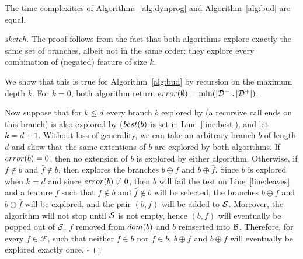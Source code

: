 \documentclass{llncs}
\def\posclass{+}
\def\negclass{-}
\def\datasymb{D}
\newcommand{\setex}[1]{\ensuremath{{\mathcal \datasymb}^{#1}}\xspace}
\newcommand{\posex}{{\setex{\posclass}}\xspace}
\newcommand{\negex}{{\setex{\negclass}}\xspace}
\newcommand{\features}{\ensuremath{{\mathcal F}}\xspace}
\newcommand{\bud}[0]{\ensuremath{{\cal B}}}
\newcommand{\sequence}[0]{\ensuremath{{\cal S}}}
\newcommand{\afeat}[0]{\ensuremath{f}}
\newcommand{\dom}[1][]{\ensuremath{\ifthenelse{\equal{#1}{}}{dom}{dom({#1})}}}
\newcommand{\best}[1][]{\ensuremath{\ifthenelse{\equal{#1}{}}{{best}}{{best({#1})}}}}
\newcommand{\error}[1][]{\ensuremath{\ifthenelse{\equal{#1}{}}{{error}}{{error({{#1}})}}}}
\newcommand{\abranch}[0]{\ensuremath{b}}
\newcommand{\mdepth}[0]{\ensuremath{k}}
\newcommand{\grow}[2]{\ensuremath{{#1}\oplus{#2}}}
\begin{document}



		

		\begin{theorem}
			The time complexities of Algorithms~\ref{alg:dynprog} and Algorithm~\ref{alg:bud} are equal.
			\end{theorem}
			
			\begin{proof}[sketch]
				The proof follows from the fact that both algorithms explore exactly the same set of branches, albeit not in the same order:
				they explore every combination of (negated) feature of size $\mdepth$.
				
				We show that this is true for Algorithm~\ref{alg:bud} by recursion on the maximum depth $\mdepth$.
				For $\mdepth = 0$, both algorithm return $\error[\emptyset]=\min(|\negex|, |\posex|)$.
				
				Now suppose that for $\mdepth \leq d$ every branch $\abranch$ explored by \dynprog (a recursive call ends on this branch) is also explored by \budalg ($\best[\abranch]$ is set in Line~\ref{line:best}), and let $\mdepth=d+1$. Without loss of generality, we can take an arbitrary branch $\abranch$ of length $d$ and show that the same extentions of $\abranch$ are explored by both algorithms.
				If $\error[\abranch]=0$, then no extension of $\abranch$ is explored by either algorithm.
				Otherwise, if $\afeat \not\in \abranch$ and $\bar{\afeat}\not\in \abranch$, then 
				\dynprog explores the branches $\grow{\abranch}{\afeat}$ and $\grow{\abranch}{\bar{\afeat}}$.
				Since $\abranch$ is explored when $\mdepth = d$ and since $\error[\abranch] \neq 0$, then $\abranch$ will fail the test on Line~\ref{line:leaves} and a feature $\afeat$ such that $\afeat \not\in \abranch$ and $\bar{\afeat}\not\in \abranch$ will be selected, 
				the branches $\grow{\abranch}{\afeat}$ and $\grow{\abranch}{\bar{\afeat}}$ will be explored, and the pair $(\abranch, \afeat)$ will be added to $\sequence$. 
				Moreover, the algorithm will not stop until $\sequence$ is not empty, hence $(\abranch, \afeat)$ will eventually be popped out of $\sequence$, $\afeat$ removed from $\dom[\abranch]$ and $\abranch$ reinserted into $\bud$. Therefore, for every $\afeat \in \features$, such that neither $\afeat \in \abranch$ nor $\bar{\afeat}\in \abranch$,
				 $\grow{\abranch}{\afeat}$ and $\grow{\abranch}{\bar{\afeat}}$ will eventually be explored exactly once.
				\hfill$\square$
			\end{proof}
			
\end{document}
